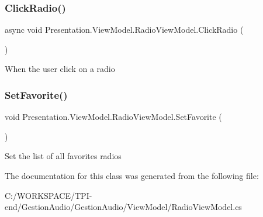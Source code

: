 \subsubsection{\texorpdfstring{Click\+Radio()}{ClickRadio()}}
{\footnotesize\ttfamily async void Presentation.\+View\+Model.\+Radio\+View\+Model.\+Click\+Radio (\begin{DoxyParamCaption}{ }\end{DoxyParamCaption})}



When the user click on a radio 

\mbox{\label{class_presentation_1_1_view_model_1_1_radio_view_model_a66d0f5118de150b5c1cc6cde2eef710a}} 
\subsubsection{\texorpdfstring{Set\+Favorite()}{SetFavorite()}}
{\footnotesize\ttfamily void Presentation.\+View\+Model.\+Radio\+View\+Model.\+Set\+Favorite (\begin{DoxyParamCaption}{ }\end{DoxyParamCaption})}



Set the list of all favorites radios 



The documentation for this class was generated from the following file\+:\begin{DoxyCompactItemize}
\item 
C\+:/\+W\+O\+R\+K\+S\+P\+A\+C\+E/\+T\+P\+I-\/end/\+Gestion\+Audio/\+Gestion\+Audio/\+View\+Model/Radio\+View\+Model.\+cs\end{DoxyCompactItemize}
